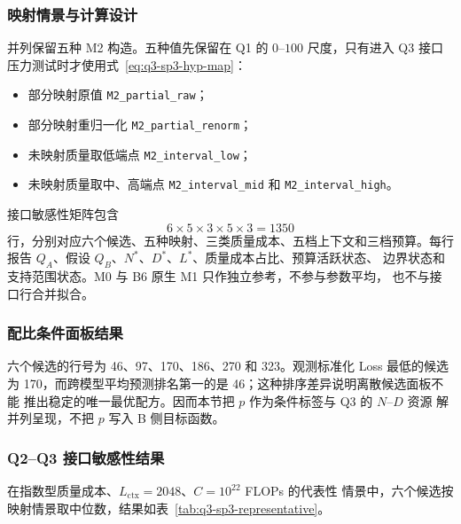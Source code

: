 \subsubsection{映射情景与计算设计}

并列保留五种 M2 构造。五种值先保留在 Q1 的 $0$--$100$ 尺度，只有进入 Q3
接口压力测试时才使用式~\eqref{eq:q3-sp3-hyp-map}：
\begin{itemize}
  \item 部分映射原值 \texttt{M2\_partial\_raw}；
  \item 部分映射重归一化 \texttt{M2\_partial\_renorm}；
  \item 未映射质量取低端点 \texttt{M2\_interval\_low}；
  \item 未映射质量取中、高端点 \texttt{M2\_interval\_mid} 和
  \texttt{M2\_interval\_high}。
\end{itemize}

接口敏感性矩阵包含
\begin{equation}
 6\times5\times3\times5\times3=1350
\end{equation}
行，分别对应六个候选、五种映射、三类质量成本、五档上下文和三档预算。每行
报告 $Q_A$、假设 $Q_B$、$N^*$、$D^*$、$L^*$、质量成本占比、预算活跃状态、
边界状态和支持范围状态。M0 与 B6 原生 M1 只作独立参考，不参与参数平均，
也不与接口行合并拟合。

\subsubsection{配比条件面板结果}

六个候选的行号为 46、97、170、186、270 和 323。观测标准化 Loss 最低的候选
为 170，而跨模型平均预测排名第一的是 46；这种排序差异说明离散候选面板不能
推出稳定的唯一最优配方。因而本节把 $p$ 作为条件标签与 Q3 的 $N$--$D$ 资源
解并列呈现，不把 $p$ 写入 B 侧目标函数。

\subsubsection{Q2--Q3 接口敏感性结果}

在指数型质量成本、$L_{\mathrm{ctx}}=2048$、$C=10^{22}$ FLOPs 的代表性
情景中，六个候选按映射情景取中位数，结果如表~\ref{tab:q3-sp3-representative}。

